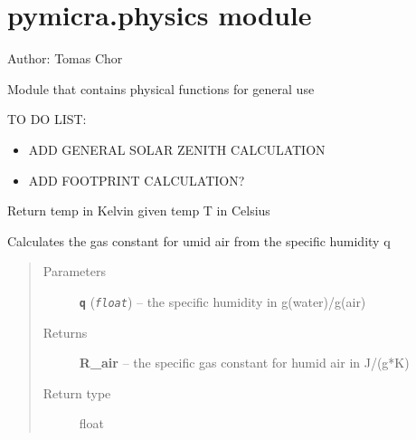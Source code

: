 \documentclass[a4paper,10pt,oneside]{sphinxmanual}
\begin{document}
\section{pymicra.physics module}
\label{pymicra:pymicra-physics-module}\label{pymicra:module-pymicra.physics}
Author: Tomas Chor

Module that contains physical functions for general use

TO DO LIST:
\begin{itemize}
\item {} 
ADD GENERAL SOLAR ZENITH CALCULATION

\item {} 
ADD FOOTPRINT CALCULATION?

\end{itemize}

\begin{fulllineitems}
\label{pymicra:pymicra.physics.CtoK}
Return temp in Kelvin given temp T in Celsius

\end{fulllineitems}


\begin{fulllineitems}
\label{pymicra:pymicra.physics.R_moistAir}
Calculates the gas constant for umid air from the specific humidity q
\begin{quote}\begin{description}
\item[{Parameters}] \leavevmode
\textbf{\texttt{q}} (\emph{\texttt{float}}) -- the specific humidity in g(water)/g(air)

\item[{Returns}] \leavevmode
\textbf{R\_air} -- the specific gas constant for humid air in J/(g*K)

\item[{Return type}] \leavevmode
float

\end{description}\end{quote}

\end{fulllineitems}

\end{document}
